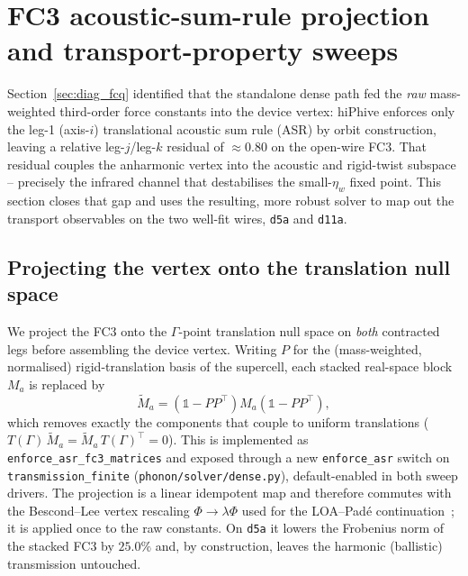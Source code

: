 \section{FC3 acoustic-sum-rule projection and transport-property sweeps}
\label{sec:diag_asr_sweeps}

Section~\ref{sec:diag_fcq} identified that the standalone dense path fed the
\emph{raw} mass-weighted third-order force constants into the device vertex: hiPhive
enforces only the leg-1 (axis-$i$) translational acoustic sum rule (ASR) by orbit
construction, leaving a relative leg-$j$/leg-$k$ residual of $\approx 0.80$ on the
open-wire FC3. That residual couples the anharmonic vertex into the acoustic and
rigid-twist subspace -- precisely the infrared channel that destabilises the
small-$\eta_w$ fixed point. This section closes that gap and uses the resulting,
more robust solver to map out the transport observables on the two well-fit wires,
\texttt{d5a} and \texttt{d11a}.

\subsection{Projecting the vertex onto the translation null space}
\label{sec:diag_asr_proj}

We project the FC3 onto the $\Gamma$-point translation null space on \emph{both}
contracted legs before assembling the device vertex. Writing $P$ for the
(mass-weighted, normalised) rigid-translation basis of the supercell, each
stacked real-space block $M_a$ is replaced by
\begin{equation}
  \tilde M_a = \left(\mathbb{1}-PP^{\!\top}\right) M_a \left(\mathbb{1}-PP^{\!\top}\right),
  \label{eq:asr_project}
\end{equation}
which removes exactly the components that couple to uniform translations
($T(\Gamma)\,\tilde M_a = \tilde M_a\,T(\Gamma)^{\!\top} = 0$). This is implemented as
\texttt{enforce\_asr\_fc3\_matrices} and exposed through a new
\texttt{enforce\_asr} switch on \texttt{transmission\_finite}
(\texttt{phonon/solver/dense.py}), default-enabled in both sweep drivers. The
projection is a linear idempotent map and therefore commutes with the
Bescond--Lee vertex rescaling $\Phi\!\to\!\lambda\Phi$ used for the LOA--Pad\'e
continuation~\cite{bescond_LOA_pade_2011,lee_anharmonic_2018}; it is applied once to
the raw constants. On \texttt{d5a} it lowers the Frobenius norm of the stacked FC3
by $25.0\%$ and, by construction, leaves the harmonic (ballistic) transmission
untouched.

